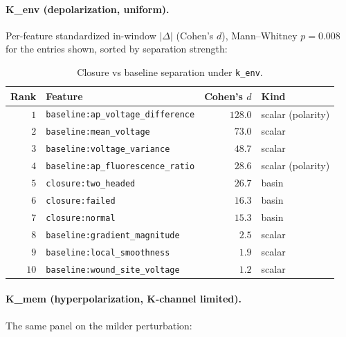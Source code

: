 \documentclass[11pt,a4paper]{article}
\begin{document}
\paragraph{K\_env (depolarization, uniform).}
Per-feature standardized in-window $|\Delta|$ (Cohen's $d$), Mann--Whitney $p=0.008$ for the entries shown, sorted by separation strength:

\begin{table}[h]\centering\small
\caption{Closure vs baseline separation under \texttt{k\_env}.}\label{tab:baselines-kenv}
\begin{tabular}{rlrl}\toprule
Rank & Feature & Cohen's $d$ & Kind \\
\midrule
$1$  & \texttt{baseline:ap\_voltage\_difference} & $\mathbf{128.0}$ & scalar (polarity) \\
$2$  & \texttt{baseline:mean\_voltage}            & $73.0$  & scalar \\
$3$  & \texttt{baseline:voltage\_variance}        & $48.7$  & scalar \\
$4$  & \texttt{baseline:ap\_fluorescence\_ratio}  & $\mathbf{28.6}$ & scalar (polarity) \\
$5$  & \texttt{closure:two\_headed}               & $26.7$  & basin \\
$6$  & \texttt{closure:failed}                    & $16.3$  & basin \\
$7$  & \texttt{closure:normal}                    & $15.3$  & basin \\
$8$  & \texttt{baseline:gradient\_magnitude}      & $2.5$   & scalar \\
$9$  & \texttt{baseline:local\_smoothness}        & $1.9$   & scalar \\
$10$ & \texttt{baseline:wound\_site\_voltage}     & $1.2$   & scalar \\
\bottomrule\end{tabular}
\end{table}

\paragraph{K\_mem (hyperpolarization, K-channel limited).}
The same panel on the milder perturbation:
\end{document}
